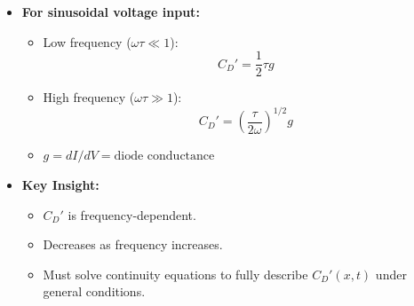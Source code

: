 			\begin{itemize}			
				\item \textbf{For sinusoidal voltage input:}
				\begin{itemize}
					\item Low frequency ($\omega \tau \ll 1$):
					\[
					C_D' = \frac{1}{2} \tau g \tag{3-32}
					\]
					\item High frequency ($\omega \tau \gg 1$):
					\[
					C_D' = \left( \frac{\tau}{2\omega} \right)^{1/2} g \tag{3-33}
					\]
					\item $g = dI/dV = \text{diode conductance}$
				\end{itemize}
			
				\item \textbf{Key Insight:}
				\begin{itemize}
					\item $C_D'$ is frequency-dependent.
					\item Decreases as frequency increases.
					\item Must solve continuity equations to fully describe $C_D'(x,t)$ under general conditions.
				\end{itemize}
			\end{itemize}
